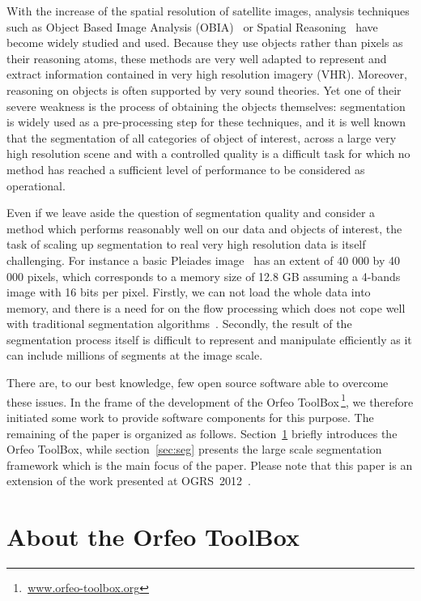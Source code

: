 \documentclass{josis}
\newcommand{\furl}[1]{$\,$\footnote{$\,$\url{#1}}}
\begin{document}
With the increase of the spatial resolution of satellite images,
analysis techniques such as Object Based Image Analysis
(OBIA)~\cite{michel2010lazy} or Spatial
Reasoning~\cite{inglada2009qualitative,vanegas2009fuzzy,vanegas2010detection}
have become widely studied and used. Because they use objects rather
than pixels as their reasoning atoms, these methods are very well
adapted to represent and extract information contained in very high
resolution imagery (VHR). Moreover, reasoning on objects is often
supported by very sound theories. Yet one of their severe weakness is
the process of obtaining the objects themselves: segmentation is
widely used as a pre-processing step for these techniques, and it is
well known that the segmentation of all categories of object of
interest, across a large very high resolution scene and with a
controlled quality is a difficult task for which no method has reached
a sufficient level of performance to be considered as operational.

Even if we leave aside the question of segmentation quality and
consider a method which performs reasonably well on our data
and objects of interest, the task of scaling up segmentation to real
very high resolution data is itself challenging.  For instance a basic
Pleiades image~\cite{tinel2012orfeo} has an extent of 40 000 by 40 000
pixels, which corresponds to a memory size of 12.8 GB assuming a
4-bands image with 16 bits per pixel. Firstly, we can not load the
whole data into memory, and there is a need for on the flow processing
which does not cope well with traditional segmentation
algorithms~\cite{shi2000normalized}. Secondly, the result of the
segmentation process itself is difficult to represent and manipulate
efficiently as it can include millions of segments at the image scale.

There are, to our best knowledge, few open source software able to
overcome these issues. In the frame of the development of the Orfeo
ToolBox\furl{www.orfeo-toolbox.org}, we therefore initiated some work
to provide software components for this purpose. The remaining of the
paper is organized as follows. Section~\ref{sec:otb} briefly
introduces the Orfeo ToolBox, while section~\ref{sec:seg} presents the
large scale segmentation framework which is the main focus of the
paper. Please note that this paper is an extension of the work
presented at OGRS~2012~\cite{michel2012open}.

\section{About the Orfeo ToolBox}\label{sec:otb}
\end{document}
